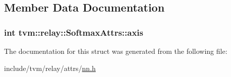 \subsection{Member Data Documentation}
\subsubsection[{\texorpdfstring{axis}{axis}}]{\setlength{\rightskip}{0pt plus 5cm}int tvm\+::relay\+::\+Softmax\+Attrs\+::axis}\hypertarget{structtvm_1_1relay_1_1SoftmaxAttrs_a0416be34a3c1df62133a06cdec50f6c5}{}\label{structtvm_1_1relay_1_1SoftmaxAttrs_a0416be34a3c1df62133a06cdec50f6c5}


The documentation for this struct was generated from the following file\+:\begin{DoxyCompactItemize}
\item 
include/tvm/relay/attrs/\hyperlink{include_2tvm_2relay_2attrs_2nn_8h}{nn.\+h}\end{DoxyCompactItemize}
